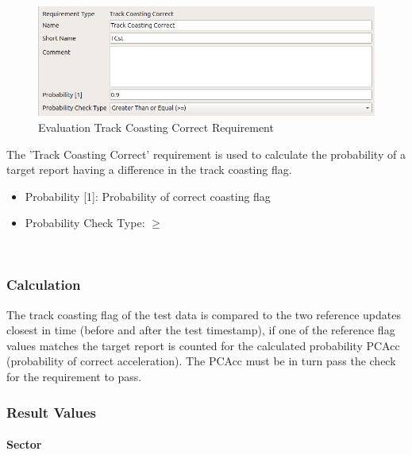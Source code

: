 \begin{figure}[H]
    \includegraphics[width=14cm,frame]{figures/eval_req_coasting.png}
  \caption{Evaluation Track Coasting Correct Requirement}
\end{figure}

The 'Track Coasting Correct’ requirement is used to calculate the probability of a target report having a difference in the track coasting flag. 

\begin{itemize}  
\item Probability [1]: Probability of correct coasting flag
\item Probability Check Type: $\geq$
\end{itemize}
\ \\

\subsubsection{Calculation}

The track coasting flag of the test data is compared to the two reference updates closest in time (before and after the test timestamp), if one of the reference flag values matches the target report is counted for the calculated probability PCAcc (probability of correct acceleration). The PCAcc must be in turn pass the check for the requirement to pass. 

\subsubsection{Result Values}

\paragraph{Sector}

